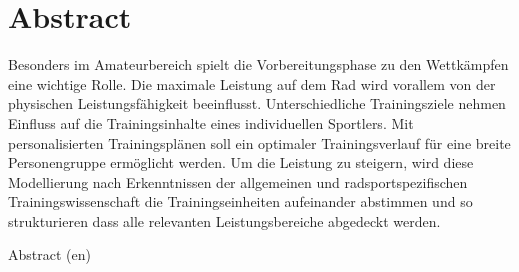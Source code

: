 \chapter*{Abstract}
\label{sec:abstract}
\vspace*{-10mm}
Besonders im Amateurbereich spielt die Vorbereitungsphase zu den Wettkämpfen eine wichtige Rolle. Die maximale Leistung auf dem Rad wird vorallem von der physischen Leistungsfähigkeit beeinflusst. Unterschiedliche Trainingsziele nehmen Einfluss auf die Trainingsinhalte eines individuellen Sportlers. Mit personalisierten Trainingsplänen soll ein optimaler Trainingsverlauf für eine breite Personengruppe ermöglicht werden.
Um die Leistung zu steigern, wird diese Modellierung nach Erkenntnissen der allgemeinen und radsportspezifischen Trainingswissenschaft die Trainingseinheiten aufeinander abstimmen und so strukturieren dass alle relevanten Leistungsbereiche abgedeckt werden.
\vspace*{20mm}

{Abstract (en)}\label{sec:abstract-diff} \\
\vspace*{-10mm}
